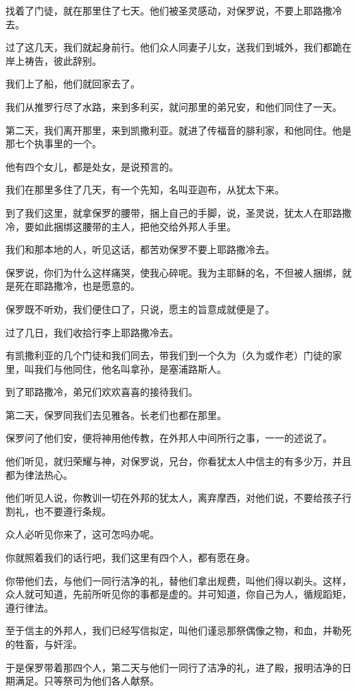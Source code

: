 \documentclass[12pt,oneside]{book}
\begin{document}
找着了门徒，就在那里住了七天。他们被圣灵感动，对保罗说，不要上耶路撒冷去。

过了这几天，我们就起身前行。他们众人同妻子儿女，送我们到城外，我们都跪在岸上祷告，彼此辞别。

我们上了船，他们就回家去了。

我们从推罗行尽了水路，来到多利买，就问那里的弟兄安，和他们同住了一天。

第二天，我们离开那里，来到凯撒利亚。就进了传福音的腓利家，和他同住。他是那七个执事里的一个。

他有四个女儿，都是处女，是说预言的。

我们在那里多住了几天，有一个先知，名叫亚迦布，从犹太下来。

到了我们这里，就拿保罗的腰带，捆上自己的手脚，说，圣灵说，犹太人在耶路撒冷，要如此捆绑这腰带的主人，把他交给外邦人手里。

我们和那本地的人，听见这话，都苦劝保罗不要上耶路撒冷去。

保罗说，你们为什么这样痛哭，使我心碎呢。我为主耶稣的名，不但被人捆绑，就是死在耶路撒冷，也是愿意的。

保罗既不听劝，我们便住口了，只说，愿主的旨意成就便是了。

过了几日，我们收拾行李上耶路撒冷去。

有凯撒利亚的几个门徒和我们同去，带我们到一个久为（久为或作老）门徒的家里，叫我们与他同住，他名叫拿孙，是塞浦路斯人。

到了耶路撒冷，弟兄们欢欢喜喜的接待我们。

第二天，保罗同我们去见雅各。长老们也都在那里。

保罗问了他们安，便将神用他传教，在外邦人中间所行之事，一一的述说了。

他们听见，就归荣耀与神，对保罗说，兄台，你看犹太人中信主的有多少万，并且都为律法热心。

他们听见人说，你教训一切在外邦的犹太人，离弃摩西，对他们说，不要给孩子行割礼，也不要遵行条规。

众人必听见你来了，这可怎吗办呢。

你就照着我们的话行吧，我们这里有四个人，都有愿在身。

你带他们去，与他们一同行洁净的礼，替他们拿出规费，叫他们得以剃头。这样，众人就可知道，先前所听见你的事都是虚的。并可知道，你自己为人，循规蹈矩，遵行律法。

至于信主的外邦人，我们已经写信拟定，叫他们谨忌那祭偶像之物，和血，并勒死的牲畜，与奸淫。

于是保罗带着那四个人，第二天与他们一同行了洁净的礼，进了殿，报明洁净的日期满足。只等祭司为他们各人献祭。
\end{document}
